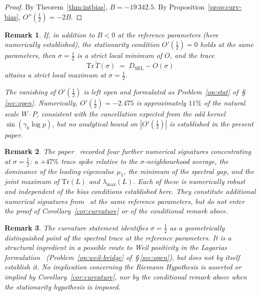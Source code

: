 \documentclass[11pt]{article}
\newtheorem*{remark}{Remark}
\newcommand{\Tt}{\widetilde{T}}
\newcommand{\DSEL}{D_{\mathrm{SEL}}}
\begin{document}
\begin{proof}
By Theorem~\ref{thm:intbias}, $B=-19\,342.5$.
By Proposition~\ref{prop:curv-bias}, $O''(\tfrac12)=-2B$.
\end{proof}

\begin{remark}
If, in addition to $B<0$ at the reference parameters (here numerically
established), the stationarity condition $O'(\tfrac12)=0$ holds at the
same parameters, then $\sigma=\tfrac12$ is a strict local minimum of
$O$, and the trace
\[
\mathrm{Tr}\,\Tt(\sigma) \;=\; \DSEL - O(\sigma)
\]
attains a strict local maximum at $\sigma=\tfrac12$.

The vanishing of $O'(\tfrac12)$ is left open and formulated as
Problem~\ref{op:stat} of~\S\,\ref{sec:open}.
Numerically, $O'(\tfrac12)=-2.475$ is approximately $11\%$ of the
natural scale $W\cdot P$, consistent with the cancellation expected
from the odd kernel $\sin(\gamma_k\log p)$, but no analytical bound on
$|O'(\tfrac12)|$ is established in the present paper.
\end{remark}

\begin{remark}
The paper~\cite{Paper5} recorded four further numerical signatures
concentrating at $\sigma=\tfrac12$: a $+47\%$ trace spike relative to
the $\sigma$-neighbourhood average, the dominance of the leading
eigenvalue $\mu_1$, the minimum of the spectral gap, and the joint
maximum of $\mathrm{Tr}(L)$ and $\lambda_{\max}(L)$.
Each of these is numerically robust and independent of the bias
conditions established here.
They constitute additional numerical signatures from~\cite{Paper5} at
the same reference parameters, but do not enter the proof of
Corollary~\ref{cor:curvature} or of the conditional remark above.
\end{remark}

\begin{remark}
The curvature statement identifies $\sigma=\tfrac12$ as a geometrically
distinguished point of the spectral trace at the reference parameters.
It is a structural ingredient in a possible route to Weil positivity
in the Lagarias formulation~\cite{Lagarias}
(Problem~\ref{op:weil-bridge} of~\S\,\ref{sec:open}), but does not by
itself establish it.
No implication concerning the Riemann Hypothesis is asserted or
implied by Corollary~\ref{cor:curvature}, nor by the conditional remark
above when the stationarity hypothesis is imposed.
\end{remark}

\end{document}
